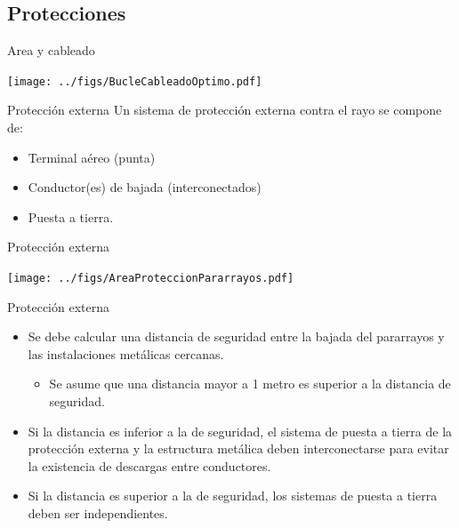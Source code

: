 \documentclass[aspectratio=169, usenames,svgnames,dvipsnames]{beamer}
\begin{document}
\subsection{Protecciones}
\label{sec:orgc29de92}


\begin{frame}[label={sec:org8aaf709}]{Area y cableado}
\begin{center}
\texttt{[image: ../figs/BucleCableadoOptimo.pdf]}
\end{center}
\end{frame}

\begin{frame}[label={sec:org1605d9a}]{Protección externa}
Un sistema de protección externa contra el rayo se compone de:

\begin{itemize}
\item Terminal aéreo (punta)

\item Conductor(es) de bajada (interconectados)

\item Puesta a tierra.
\end{itemize}
\end{frame}

\begin{frame}[label={sec:org4cb0fb0}]{Protección externa}
\begin{center}
\texttt{[image: ../figs/AreaProteccionPararrayos.pdf]}
\end{center}
\end{frame}

\begin{frame}[label={sec:org5c0dcc6}]{Protección externa}
\begin{itemize}
\item Se debe calcular una \alert{distancia de seguridad} entre la bajada del
pararrayos y las instalaciones metálicas cercanas.

\begin{itemize}
\item Se asume que una distancia mayor a 1 metro es superior a la distancia
de seguridad.
\end{itemize}

\item \alert{Si la distancia es inferior a la de seguridad}, el sistema de puesta
a tierra de la protección externa y la estructura metálica deben
\alert{interconectarse} para evitar la existencia de descargas entre
conductores.

\item \alert{Si la distancia es superior a la de seguridad}, los sistemas de
puesta a tierra deben ser \alert{independientes}.
\end{itemize}
\end{frame}
\end{document}
